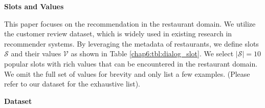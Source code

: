 \textbf{Slots and Values}
\label{chap6:sec:slotvalue}

This paper focuses on the recommendation in the restaurant domain.
We utilize the customer review dataset, which is widely used in existing research in recommender systems.
By leveraging the metadata of restaurants, we define slots $\mathcal{S}$ and their values $\mathcal{V}$ as shown in Table \ref{chap6:tbl:dialog_slot}. 
We select $\vert \mathcal{S} \vert = 10$ popular slots with rich values that can be encountered in the restaurant domain.
We omit the full set of values for brevity and only list a few examples. (Please refer to our dataset for the exhaustive list).

\begin{table}[H]
    \centering
    \vspace{-4pt}
    \caption{Slots $\mathcal{S}$ and values $\mathcal{V}$.}     
    \vspace{-10pt}
\label{chap6:tbl:dialog_slot}
\end{table}


\textbf{Dataset}\\
\label{chap6:sec:dataset}

